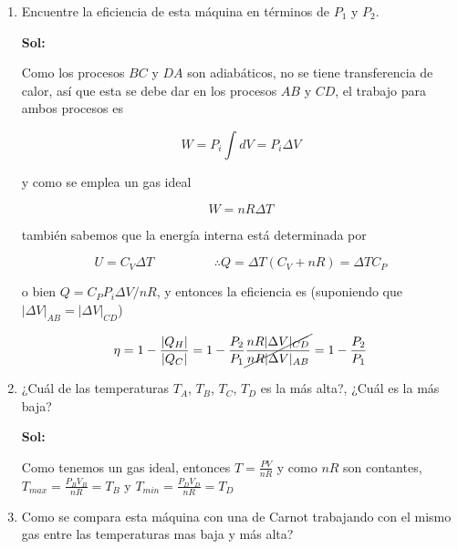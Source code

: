\documentclass[12pt,a4paper]{article}
\begin{document}
\begin{enumerate}
    \begin{enumerate}
        \item Encuentre la eficiencia de esta máquina en términos de $P_1$ y $P_2$.
        
        \textbf{Sol:}
        
        Como los procesos $BC$ y $DA$ son adiabáticos, no se tiene transferencia de calor, así que esta se debe dar en los procesos $AB$ y $CD$, el trabajo para ambos procesos es
        
        \begin{equation*}
            W = P_i\int d V = P_i \Delta V 
        \end{equation*}
        
        y como se emplea un gas ideal
        
        \begin{equation*}
          W = nR \Delta T   
        \end{equation*}
        
        también sabemos que la energía interna está determinada por
        
        \begin{equation*}
            U = C_V \Delta T \hspace{2cm} \therefore Q = \Delta T (C_V + nR) = \Delta T C_P
        \end{equation*}
        
        o bien $Q = C_P P_i \Delta V /nR$, y entonces la eficiencia es (suponiendo que $|\Delta V |_{AB} = |\Delta V| _{CD}$)
        
        \begin{equation*}
            \eta = 1 - \frac{|Q_H|}{|Q_C|} = 1 -  \frac{P_2}{P_1} \cancel{\frac{nR |\Delta V|_{CD}}{nR |\Delta V|_{AB}}} = 1 - \frac{P_2}{P_1}
        \end{equation*}
        
        \item ¿Cuál de las temperaturas $T_A$, $T_B$, $T_C$, $T_D$ es la más alta?, ¿Cuál es la más baja?
        
        \textbf{Sol:}
        
        Como tenemos un gas ideal, entonces $T = \frac{PV}{nR}$ y como $nR$ son contantes, $T_{max} = \frac{P_B V_B}{nR} = T_B$ y $T_{min} = \frac{P_D V_D}{nR} = T_D$ 
        
        \item Como se compara esta máquina con una de Carnot trabajando con el mismo gas entre las temperaturas mas baja y más alta?
        

\end{enumerate}
\end{enumerate}
\end{document}
